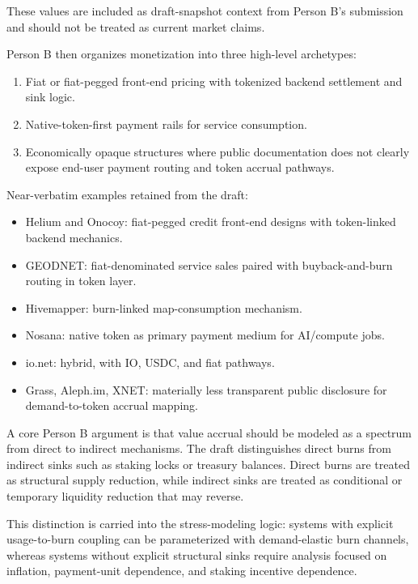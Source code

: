 These values are included as draft-snapshot context from Person B's submission and should not be treated as current market claims.

Person B then organizes monetization into three high-level archetypes:
\begin{enumerate}
    \item Fiat or fiat-pegged front-end pricing with tokenized backend settlement and sink logic.
    \item Native-token-first payment rails for service consumption.
    \item Economically opaque structures where public documentation does not clearly expose end-user payment routing and token accrual pathways.
\end{enumerate}

Near-verbatim examples retained from the draft:
\begin{itemize}
    \item Helium and Onocoy: fiat-pegged credit front-end designs with token-linked backend mechanics.
    \item GEODNET: fiat-denominated service sales paired with buyback-and-burn routing in token layer.
    \item Hivemapper: burn-linked map-consumption mechanism.
    \item Nosana: native token as primary payment medium for AI/compute jobs.
    \item io.net: hybrid, with IO, USDC, and fiat pathways.
    \item Grass, Aleph.im, XNET: materially less transparent public disclosure for demand-to-token accrual mapping.
\end{itemize}

A core Person B argument is that value accrual should be modeled as a spectrum from direct to indirect mechanisms. The draft distinguishes direct burns from indirect sinks such as staking locks or treasury balances. Direct burns are treated as structural supply reduction, while indirect sinks are treated as conditional or temporary liquidity reduction that may reverse.

This distinction is carried into the stress-modeling logic: systems with explicit usage-to-burn coupling can be parameterized with demand-elastic burn channels, whereas systems without explicit structural sinks require analysis focused on inflation, payment-unit dependence, and staking incentive dependence.

